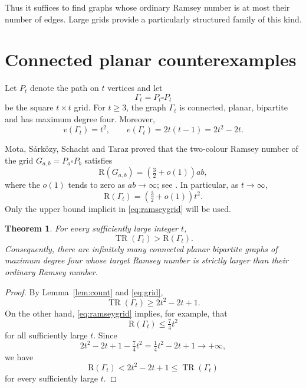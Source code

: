 \documentclass[10pt,a4paper]{amsart}
\newtheorem{theorem}{Theorem}
\DeclareMathOperator{\TR}{TR}
\newcommand{\R}{\mathrm{R}}
\begin{document}
Thus it suffices to find graphs whose ordinary Ramsey number is at most their number of edges. Large grids provide a particularly structured family of this kind.

\section{Connected planar counterexamples}

Let $P_t$ denote the path on $t$ vertices and let
\[
\Gamma_t = P_t \square P_t
\]
be the square $t \times t$ grid. For $t \geq 3$, the graph $\Gamma_t$ is connected, planar, bipartite and has maximum degree four. Moreover,
\begin{equation}\label{eq:grid}
v(\Gamma_t) = t^2, \qquad e(\Gamma_t) = 2t(t-1) = 2t^2 - 2t.
\end{equation}

Mota, S\'ark\"ozy, Schacht and Taraz proved that the two-colour Ramsey number of the grid $G_{a,b} = P_a \square P_b$ satisfies
\[
\R(G_{a,b}) = \left( \tfrac{3}{2} + o(1) \right) ab,
\]
where the $o(1)$ tends to zero as $ab \to \infty$; see \cite[Corollary 1.4]{MSST}. In particular, as $t \to \infty$,
\begin{equation}\label{eq:ramseygrid}
\R(\Gamma_t) = \left( \tfrac{3}{2} + o(1) \right) t^2.
\end{equation}
Only the upper bound implicit in \eqref{eq:ramseygrid} will be used.

\begin{theorem}\label{thm:planar}
For every sufficiently large integer $t$,
\[
\TR(\Gamma_t) > \R(\Gamma_t).
\]
Consequently, there are infinitely many connected planar bipartite graphs of maximum degree four whose target Ramsey number is strictly larger than their ordinary Ramsey number.
\end{theorem}

\begin{proof}
By Lemma~\ref{lem:count} and \eqref{eq:grid},
\begin{equation}\label{eq:trgrid}
\TR(\Gamma_t) \geq 2t^2 - 2t + 1.
\end{equation}
On the other hand, \eqref{eq:ramseygrid} implies, for example, that
\[
\R(\Gamma_t) \leq \tfrac{7}{4} t^2
\]
for all sufficiently large $t$. Since
\[
2t^2 - 2t + 1 - \tfrac{7}{4} t^2 = \tfrac{1}{4} t^2 - 2t + 1 \longrightarrow +\infty,
\]
we have
\[
\R(\Gamma_t) < 2t^2 - 2t + 1 \leq \TR(\Gamma_t)
\]
for every sufficiently large $t$.
\end{proof}
\end{document}
